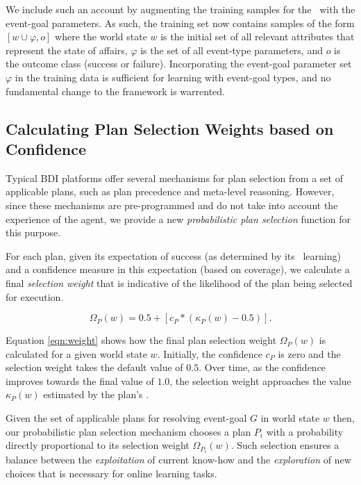 We include such an account by augmenting the training samples for the \dt\ with the event-goal parameters. As such, the training set now contains samples of the form $[w \cup \varphi,o]$ where the world state $w$ is the initial set of all relevant attributes that represent the state of affairs, $\varphi$ is the set of all event-type parameters, and $o$ is the outcome class (success or failure). Incorporating the event-goal parameter set $\varphi$ in the training data is sufficient for learning with event-goal types, and no fundamental change to the framework is warrented.


\subsection{Calculating Plan Selection Weights based on Confidence}


Typical BDI platforms offer several mechanisms for plan selection from a set of applicable plans, such as plan precedence and meta-level reasoning. However, since these mechanisms are pre-programmed and do not take into account the experience of the agent, we provide a new \textit{probabilistic plan selection} function for this purpose. 

For each plan, given its expectation of success (as determined by its \dt\ learning) and a confidence measure in this expectation (based on coverage), we calculate a final \textit{selection weight} that is indicative of the likelihood of the plan being selected for execution.

\begin{equation}\label{eqn:weight}   
\Omega_P(w) = 0.5 + \left[  c_P *  \left( \kappa_P(w) - 0.5 \right)  \right].
\end{equation}

Equation \ref{eqn:weight} shows how the final plan selection weight $\Omega_P(w)$ is calculated for a given world state $w$. Initially, the confidence $c_P$ is zero and the selection weight takes the default value of $0.5$. Over time, as the confidence improves towards the final value of $1.0$, the selection weight approaches the value $\kappa_P(w)$ estimated by the plan's \dt.

Given the set of applicable plans for resolving event-goal $G$ in world state $w$ then, our probabilistic plan selection mechanism chooses a plan $P_i$ with a probability directly proportional to its selection weight $\Omega_{P_i}(w)$. Such selection ensures a balance between the \emph{exploitation} of current know-how and the \textit{exploration} of new choices that is necessary for online learning tasks. 



